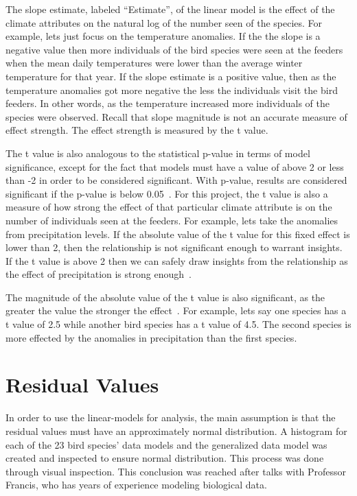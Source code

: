 The slope estimate, labeled ``Estimate'', of the linear model is the effect of the climate attributes on the natural log of the number seen of the species. For example, lets just focus on the temperature anomalies. If the the slope is a negative value then more individuals of the bird species were seen at the feeders when the mean daily temperatures were lower than the average winter temperature for that year. If the slope estimate is a positive value, then as the temperature anomalies got more negative the less the individuals visit the bird feeders. In other words, as the temperature increased more individuals of the species were observed. Recall that slope magnitude is not an accurate measure of effect strength. The effect strength is measured by the t value. 

The t value is also analogous to the statistical p-value in terms of model significance, except for the fact that models must have a value of above 2 or less than -2 in order to be considered significant. With p-value, results are considered significant if the p-value is below 0.05~\cite{p-value:online}. For this project, the t value is also a measure of how strong the effect of that particular climate attribute is on the number of individuals seen at the feeders. For example, lets take the anomalies from precipitation levels. If the absolute value of the t value for this fixed effect is lower than 2, then the relationship is not significant enough to warrant insights. If the t value is above 2 then we can safely draw insights from the relationship as the effect of precipitation is strong enough~\cite{t-value:online}. 

The magnitude of the absolute value of the t value is also significant, as the greater the value the stronger the effect~\cite{t-value-interp:online}. For example, lets say one species has a t value of 2.5 while another bird species has a t value of 4.5. The second species is more effected by the anomalies in precipitation than the first species.  

\section{Residual Values}

In order to use the linear-models for analysis, the main assumption is that the residual values must have an approximately normal distribution. A histogram for each of the 23 bird species' data models and the generalized data model was created and inspected to ensure normal distribution. This process was done through visual inspection. This conclusion was reached after talks with Professor Francis, who has years of experience modeling biological data.

